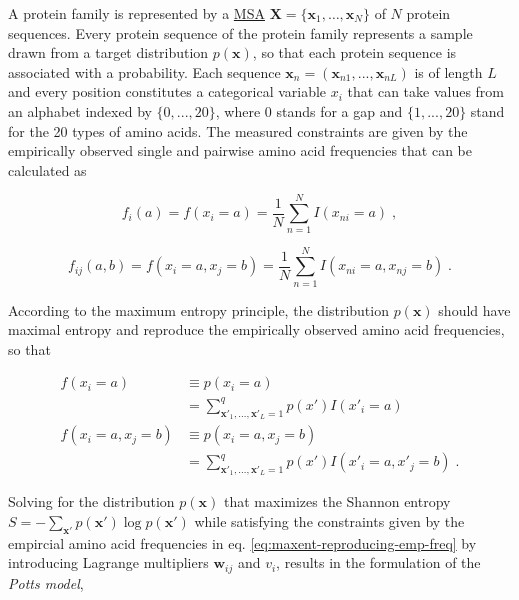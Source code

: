 \documentclass[11pt,a4paper,twoside]{book}
\newcommand{\eq}{\!=\!}
\newcommand{\seq}{\mathbf{x}}
\newcommand{\vi}{v_{i}}
\newcommand{\wij}{\mathbf{w}_{ij}}
\newcommand{\X}{\mathbf{X}}
\theoremstyle{definition}
\theoremstyle{definition}
\theoremstyle{remark}
\begin{document}
A protein family is represented by a \protect\hyperlink{abbrev}{MSA}
\(\X = \{ \seq_1, \ldots, \seq_N \}\) of \(N\) protein sequences. Every
protein sequence of the protein family represents a sample drawn from a
target distribution \(p(\seq)\), so that each protein sequence is
associated with a probability. Each sequence
\(\seq_n = (\seq_{n1}, ..., \seq_{nL})\) is of length \(L\) and every
position constitutes a categorical variable \(x_{i}\) that can take
values from an alphabet indexed by \(\{0, ..., 20\}\), where 0 stands
for a gap and \(\{1, ... , 20\}\) stand for the 20 types of amino acids.
The measured constraints are given by the empirically observed single
and pairwise amino acid frequencies that can be calculated as

\begin{equation}
    f_i(a) = f(x_i\eq a) = \frac{1}{N}\sum_{n=1}^N I(x_{ni} \eq a) \; ,
\end{equation}

\begin{equation}
    f_{ij}(a,b) = f(x_i\eq a, x_j\eq b) = \frac{1}{N} \sum_{n=1}^N I(x_{ni} \eq a, x_{nj} \eq b) \; .
 \label{eq:emp-freq}
\end{equation}

According to the maximum entropy principle, the distribution \(p(\seq)\)
should have maximal entropy and reproduce the empirically observed amino
acid frequencies, so that

\begin{align}
   f(x_i\eq a)            &\equiv p(x_i\eq a)  \nonumber\\
                                    &= \sum_{\seq\prime_1, \ldots, \seq\prime_L = 1}^{q} p(x\prime) I(x\prime_i \eq a) \\
  f(x_i\eq a, x_j\eq b)   &\equiv p(x_i\eq a, x_j \eq b) \nonumber \\
                                    &= \sum_{\seq\prime_1, \ldots, \seq\prime_L = 1}^{q}  p(x\prime) I(x\prime_i\eq a, x\prime_j \eq b)  \; .
 \label{eq:maxent-reproducing-emp-freq}
\end{align}

Solving for the distribution \(p(\seq)\) that maximizes the Shannon
entropy \(S= -\sum_{\seq\prime} p(\seq\prime) \log p(\seq\prime)\) while
satisfying the constraints given by the empircial amino acid frequencies
in eq. \eqref{eq:maxent-reproducing-emp-freq} by introducing Lagrange
multipliers \(\wij\) and \(\vi\), results in the formulation of the
\emph{Potts model},
\end{document}
